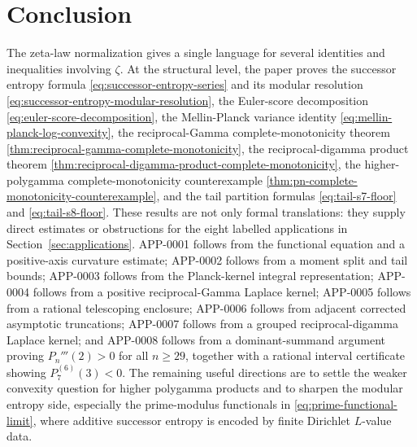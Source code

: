 \documentclass[11pt]{article}
\numberwithin{equation}{section}
\theoremstyle{definition}
\theoremstyle{remark}
\newcommand{\1}{\mathbf 1}
\begin{document}
\section{Conclusion}

The zeta-law normalization gives a single language for several identities and inequalities involving \(\zeta\).  At the structural level, the paper proves the successor entropy formula \eqref{eq:successor-entropy-series} and its modular resolution \eqref{eq:successor-entropy-modular-resolution}, the Euler-score decomposition \eqref{eq:euler-score-decomposition}, the Mellin-Planck variance identity \eqref{eq:mellin-planck-log-convexity}, the reciprocal-Gamma complete-monotonicity theorem \eqref{thm:reciprocal-gamma-complete-monotonicity}, the reciprocal-digamma product theorem \eqref{thm:reciprocal-digamma-product-complete-monotonicity}, the higher-polygamma complete-monotonicity counterexample \eqref{thm:pn-complete-monotonicity-counterexample}, and the tail partition formulas \eqref{eq:tail-s7-floor} and \eqref{eq:tail-s8-floor}.  These results are not only formal translations: they supply direct estimates or obstructions for the eight labelled applications in Section~\ref{sec:applications}.  APP-0001 follows from the functional equation and a positive-axis curvature estimate; APP-0002 follows from a moment split and tail bounds; APP-0003 follows from the Planck-kernel integral representation; APP-0004 follows from a positive reciprocal-Gamma Laplace kernel; APP-0005 follows from a rational telescoping enclosure; APP-0006 follows from adjacent corrected asymptotic truncations; APP-0007 follows from a grouped reciprocal-digamma Laplace kernel; and APP-0008 follows from a dominant-summand argument proving \(P_n'''(2)>0\) for all \(n\ge29\), together with a rational interval certificate showing \(P_7^{(6)}(3)<0\).  The remaining useful directions are to settle the weaker convexity question for higher polygamma products and to sharpen the modular entropy side, especially the prime-modulus functionals in \eqref{eq:prime-functional-limit}, where additive successor entropy is encoded by finite Dirichlet \(L\)-value data.
\end{document}

